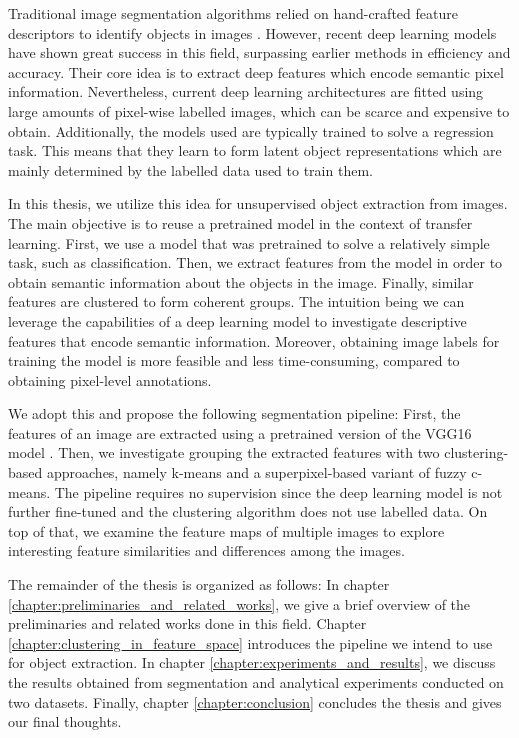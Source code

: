 Traditional image segmentation algorithms relied on hand-crafted feature descriptors to identify objects in images \parencite{minaee2021image}. However, recent deep learning models have shown great success in this field, surpassing earlier methods in efficiency and accuracy. Their core idea is to extract deep features which encode semantic pixel information. Nevertheless, current deep learning architectures are fitted using large amounts of pixel-wise labelled images, which can be scarce and expensive to obtain. Additionally, the models used are typically trained to solve a regression task. This means that they learn to form latent object representations which are mainly determined by the labelled data used to train them.

In this thesis, we utilize this idea for unsupervised object extraction from images. The main objective is to reuse a pretrained model in the context of transfer learning. First, we use a model that was pretrained to solve a relatively simple task, such as classification. Then, we extract features from the model in order to obtain semantic information about the objects in the image. Finally, similar features are clustered to form coherent groups. The intuition being we can leverage the capabilities of a deep learning model to investigate descriptive features that encode semantic information. Moreover, obtaining image labels for training the model is more feasible and less time-consuming, compared to obtaining pixel-level annotations.

We adopt this and propose the following segmentation pipeline: First, the features of an image are extracted using a pretrained version of the VGG16 model \parencite{simonyan2014very}. Then, we investigate grouping the extracted features with two clustering-based approaches, namely k-means and a superpixel-based variant of fuzzy c-means. The pipeline requires no supervision since the deep learning model is not further fine-tuned and the clustering algorithm does not use labelled data. On top of that, we examine the feature maps of multiple images to explore interesting feature similarities and differences among the images.

The remainder of the thesis is organized as follows: In chapter \ref{chapter:preliminaries_and_related_works}, we give a brief overview of the preliminaries and related works done in this field. Chapter \ref{chapter:clustering_in_feature_space} introduces the pipeline we intend to use for object extraction. In chapter \ref{chapter:experiments_and_results}, we discuss the results obtained from segmentation and analytical experiments conducted on two datasets. Finally, chapter \ref{chapter:conclusion} concludes the thesis and gives our final thoughts.